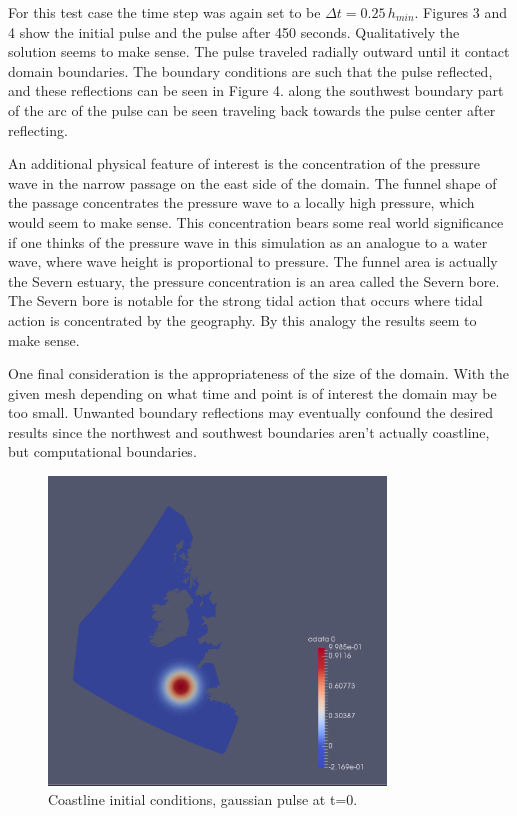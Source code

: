 \documentclass[letterpaper,10pt]{article}
\begin{document}
For this test case the time step was again set to be $\Delta t=0.25 \, h_{min}$. Figures 3 and 4 show the initial pulse and the pulse after 450 seconds. Qualitatively the solution seems to make sense. The pulse traveled radially outward until it contact domain boundaries. The boundary conditions are such that the pulse reflected, and these reflections can be seen in Figure 4. along the southwest boundary part of the arc of the pulse can be seen traveling back towards the pulse center after reflecting.

An additional physical feature of interest is the concentration of the pressure wave in the narrow passage on the east side of the domain. The funnel shape of the passage concentrates the pressure wave to a locally high pressure, which would seem to make sense. This concentration bears some real world significance if one thinks of the pressure wave in this simulation as an analogue to a water wave, where wave height is proportional to pressure. The funnel area is actually the Severn estuary, the pressure concentration is an area called the Severn bore. The Severn bore is notable for the strong tidal action that occurs where tidal action is concentrated by the geography. By this analogy the results seem to make sense.

One final consideration is the appropriateness of the size of the domain. With the given mesh depending on what time and point is of interest the domain may be too small. Unwanted boundary reflections may eventually confound the desired results since the northwest and southwest boundaries aren't actually coastline, but computational boundaries.

\begin{figure}[!htb]
\centering
\includegraphics[width=0.8\textwidth]{captureT0.PNG}
\caption{\label{fig:unrolled}Coastline initial conditions, gaussian pulse at t=0.}
\end{figure}
\end{document}
